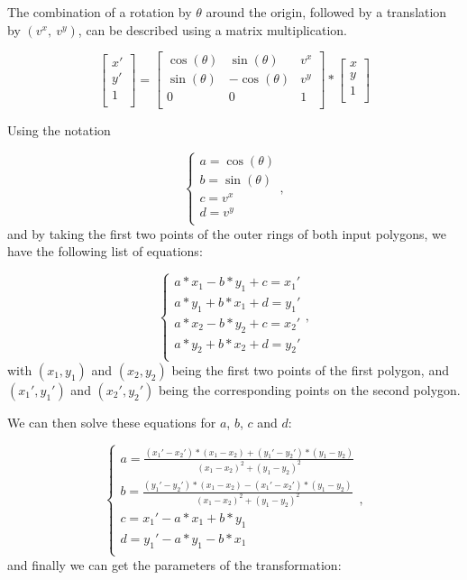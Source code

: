 The combination of a rotation by $\theta$ around the origin, followed by a translation by $(v^x,\ v^y)$, can be described using a matrix multiplication.

\[
    \begin{bmatrix}
    x' \\
    y' \\ 
    1  \\       
    \end{bmatrix}
    =
    \begin{bmatrix}
    \cos(\theta) & \sin(\theta)  & v^x \\
    \sin(\theta) & -\cos(\theta) & v^y \\ 
    0            & 0             & 1   \\       
    \end{bmatrix}
    *
    \begin{bmatrix}
    x \\
    y \\ 
    1 \\       
    \end{bmatrix}
\]

Using the notation

\[
    \begin{cases}
        a = \cos(\theta) \\
        b = \sin(\theta) \\
        c = v^x          \\
        d = v^y          \\
    \end{cases}, 
\]
and by taking the first two points of the outer rings of both input polygons, we have the following list of equations:

\[
    \begin{cases}
        a*x_1 - b*y_1 + c = x_1' \\
        a*y_1 + b*x_1 + d = y_1' \\
        a*x_2 - b*y_2 + c = x_2' \\
        a*y_2 + b*x_2 + d = y_2' \\
    \end{cases}, 
\]
with $(x_1, y_1)$ and $(x_2, y_2)$ being the first two points of the first polygon, and $(x_1', y_1')$ and $(x_2', y_2')$ being the corresponding points on the second polygon.

We can then solve these equations for $a$, $b$, $c$ and $d$:

\[
    \begin{cases}
        a = \frac{(x_1' - x_2')*(x_1 - x_2) + (y_1' - y_2')*(y_1 - y_2)}{(x_1 - x_2)^2 + (y_1 - y_2)^2}\\
        b = \frac{(y_1' - y_2')*(x_1 - x_2) - (x_1' - x_2')*(y_1 - y_2)}{(x_1 - x_2)^2 + (y_1 - y_2)^2}\\
        c = x_1' - a*x_1 + b*y_1 \\
        d = y_1' - a*y_1 - b*x_1 \\
    \end{cases}, 
\]
and finally we can get the parameters of the transformation: 

